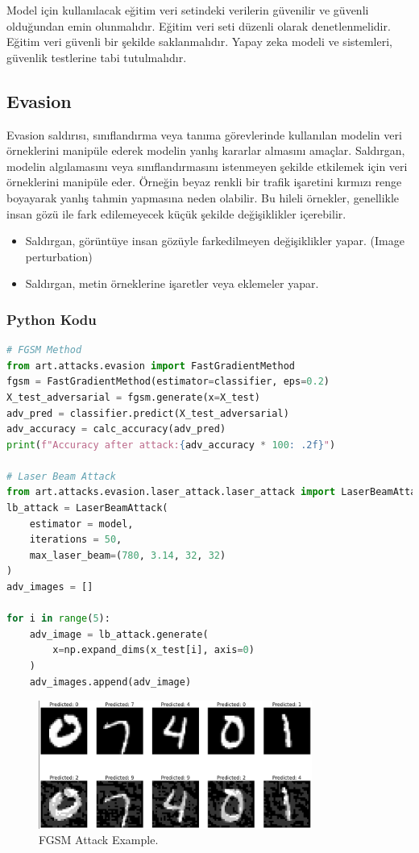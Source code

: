 Model için kullanılacak eğitim veri setindeki verilerin güvenilir ve güvenli olduğundan emin olunmalıdır. Eğitim veri seti düzenli olarak denetlenmelidir. Eğitim veri güvenli bir şekilde saklanmalıdır. Yapay zeka modeli ve sistemleri, güvenlik testlerine tabi tutulmalıdır. 

\subsection{Evasion}
Evasion saldırısı, sınıflandırma veya tanıma görevlerinde kullanılan modelin veri örneklerini manipüle ederek modelin yanlış kararlar almasını amaçlar. Saldırgan, modelin algılamasını veya sınıflandırmasını istenmeyen şekilde etkilemek için veri örneklerini manipüle eder. Örneğin beyaz renkli bir trafik işaretini kırmızı renge boyayarak yanlış tahmin yapmasına neden olabilir. Bu hileli örnekler, genellikle insan gözü ile fark edilemeyecek küçük şekilde değişiklikler içerebilir.
\begin{itemize}
    \item Saldırgan, görüntüye insan gözüyle farkedilmeyen değişiklikler yapar. (Image perturbation)
    \item Saldırgan, metin örneklerine işaretler veya eklemeler yapar.
\end{itemize}

\subsubsection{Python Kodu}

\begin{lstlisting}[language=Python]
# FGSM Method
from art.attacks.evasion import FastGradientMethod
fgsm = FastGradientMethod(estimator=classifier, eps=0.2)
X_test_adversarial = fgsm.generate(x=X_test)
adv_pred = classifier.predict(X_test_adversarial)
adv_accuracy = calc_accuracy(adv_pred)
print(f"Accuracy after attack:{adv_accuracy * 100: .2f}")

# Laser Beam Attack
from art.attacks.evasion.laser_attack.laser_attack import LaserBeamAttack
lb_attack = LaserBeamAttack(
    estimator = model,
    iterations = 50,
    max_laser_beam=(780, 3.14, 32, 32)
)
adv_images = []

for i in range(5):
    adv_image = lb_attack.generate(
        x=np.expand_dims(x_test[i], axis=0)
    )
    adv_images.append(adv_image)
\end{lstlisting}

\begin{figure}[h]
  \centering
  \includegraphics[width=0.8\textwidth]{images/evasion_fgsm.png}
  \caption{FGSM Attack Example.}
\end{figure}

